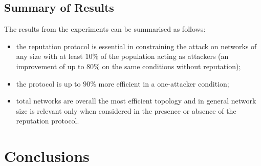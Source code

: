 \documentclass[compsoc, conference, letterpaper, 10pt, times]{IEEEtran}
\begin{document}
\subsection{Summary of Results}

The results from the experiments can be summarised as follows:
\begin{itemize}
\item the reputation protocol is essential in constraining the attack on networks of any size with at least $10\%$ of the population acting as attackers (an improvement of up to $80\%$ on the same conditions without reputation);
\item the protocol is up to $90\%$ more efficient in a one-attacker condition;
\item total networks are overall the most efficient topology and in general network size is relevant only when considered in the presence or absence of the reputation protocol.
\end{itemize}

\section{Conclusions}
\end{document}
